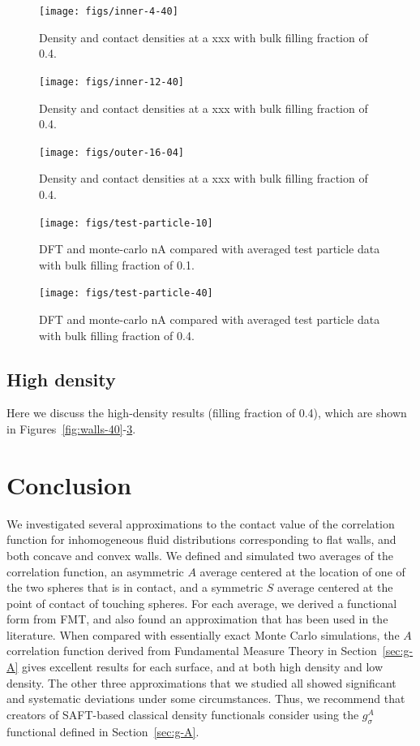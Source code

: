 \documentclass[letterpaper,twocolumn,amsmath,amssymb,jcp,10pt,aip]{revtex4-1}
\begin{document}
\begin{figure}
  \texttt{[image: figs/inner-4-40]}
  \caption{Density and contact densities at a xxx with bulk filling
    fraction of 0.4.}
  \label{fig:inner-4-40}
\end{figure}

\begin{figure}
  \texttt{[image: figs/inner-12-40]}
  \caption{Density and contact densities at a xxx with bulk filling
    fraction of 0.4.}
  \label{fig:inner-12-40}
\end{figure}

\begin{figure}
  \texttt{[image: figs/outer-16-04]}
  \caption{Density and contact densities at a xxx with bulk filling
    fraction of 0.4.}
  \label{fig:outer-40}
\end{figure}

\begin{figure}
  \texttt{[image: figs/test-particle-10]}
  \caption{DFT and monte-carlo nA compared with averaged test particle data with bulk filling
    fraction of 0.1.}
  \label{fig:test-particle-10}
\end{figure}

\begin{figure}
  \texttt{[image: figs/test-particle-40]}
  \caption{DFT and monte-carlo nA compared with averaged test particle data with bulk filling
    fraction of 0.4.}
  \label{fig:test-particle-40}
\end{figure}

\subsection{High density}

Here we discuss the high-density results (filling fraction of 0.4),
which are shown in Figures~\ref{fig:walls-40}-\ref{fig:outer-40}.

\section{Conclusion}
We investigated several approximations to the contact value of the
correlation function for inhomogeneous fluid distributions
corresponding to flat walls, and both concave and convex walls.  We
defined and simulated two averages of the correlation function, an
asymmetric $A$ average centered at the location of one of the two
spheres that is in contact, and a symmetric $S$ average centered at
the point of contact of touching spheres.  For each average, we
derived a functional form from FMT, and also found an approximation
that has been used in the literature.  When compared with essentially
exact Monte Carlo simulations, the $A$ correlation function derived
from Fundamental Measure Theory in Section~\ref{sec:g-A} gives
excellent results for each surface, and at both high density and low
density.  The other three approximations that we studied all showed
significant and systematic deviations under some circumstances.  Thus,
we recommend that creators of SAFT-based classical density functionals
consider using the $g_\sigma^A$ functional defined in
Section~\ref{sec:g-A}.
\end{document}
